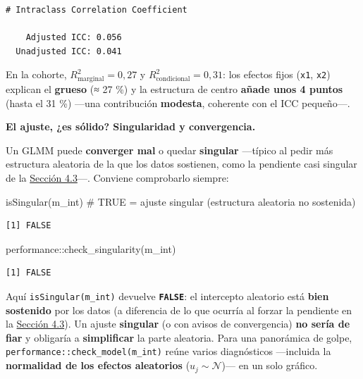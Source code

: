 \documentclass[
  letterpaper,
  DIV=11,
  numbers=noendperiod]{scrartcl}
\newenvironment{Shaded}{\begin{snugshade}}{\end{snugshade}}
\newcommand{\CommentTok}[1]{\textcolor[rgb]{0.37,0.37,0.37}{#1}}
\newcommand{\FunctionTok}[1]{\textcolor[rgb]{0.28,0.35,0.67}{#1}}
\newcommand{\NormalTok}[1]{\textcolor[rgb]{0.00,0.23,0.31}{#1}}
\newcommand{\SpecialCharTok}[1]{\textcolor[rgb]{0.37,0.37,0.37}{#1}}
\begin{document}
\begin{verbatim}
# Intraclass Correlation Coefficient

    Adjusted ICC: 0.056
  Unadjusted ICC: 0.041
\end{verbatim}

En la cohorte, \(R^2_{\text{marginal}}=0{,}27\) y
\(R^2_{\text{condicional}}=0{,}31\): los efectos fijos (\texttt{x1},
\texttt{x2}) explican el \textbf{grueso} (≈ 27 \%) y la estructura de
centro \textbf{añade unos 4 puntos} (hasta el 31 \%) ---una contribución
\textbf{modesta}, coherente con el ICC pequeño---.

\textbf{El ajuste, ¿es sólido? Singularidad y convergencia.}

Un GLMM puede \textbf{converger mal} o quedar \textbf{singular}
---típico al pedir más estructura aleatoria de la que los datos
sostienen, como la pendiente casi singular de la
\protect\hyperlink{sec-u14-pendiente}{Sección 4.3}---. Conviene
comprobarlo siempre:

\begin{Shaded}
\begin{Highlighting}[]
\FunctionTok{isSingular}\NormalTok{(m\_int)                    }\CommentTok{\# TRUE = ajuste singular (estructura aleatoria no sostenida)}
\end{Highlighting}
\end{Shaded}

\begin{verbatim}
[1] FALSE
\end{verbatim}

\begin{Shaded}
\begin{Highlighting}[]
\NormalTok{performance}\SpecialCharTok{::}\FunctionTok{check\_singularity}\NormalTok{(m\_int)}
\end{Highlighting}
\end{Shaded}

\begin{verbatim}
[1] FALSE
\end{verbatim}

Aquí \texttt{isSingular(m\_int)} devuelve \textbf{\texttt{FALSE}}: el
intercepto aleatorio está \textbf{bien sostenido} por los datos (a
diferencia de lo que ocurría al forzar la pendiente en la
\protect\hyperlink{sec-u14-pendiente}{Sección 4.3}). Un ajuste
\textbf{singular} (o con avisos de convergencia) \textbf{no sería de
fiar} y obligaría a \textbf{simplificar} la parte aleatoria. Para una
panorámica de golpe, \texttt{performance::check\_model(m\_int)} reúne
varios diagnósticos ---incluida la \textbf{normalidad de los efectos
aleatorios} (\(u_j\sim\mathcal N\))--- en un solo gráfico.
\end{document}
